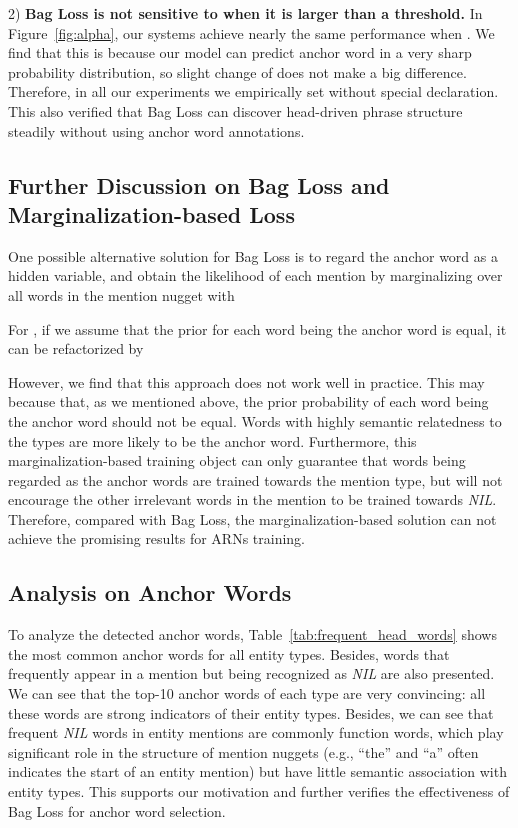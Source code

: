 \documentclass[11pt,a4paper]{article}
\begin{document}
2) \textbf{Bag Loss is not sensitive to  when it is larger than a threshold.} In Figure~\ref{fig:alpha}, our systems achieve nearly the same performance when  . We find that this is because our model can predict anchor word in a very sharp probability distribution, so slight change of  does not make a big difference. Therefore, in all our experiments we empirically set  without special declaration. This also verified that Bag Loss can discover head-driven phrase structure steadily without using anchor word annotations.

\subsection{Further Discussion on Bag Loss and Marginalization-based Loss}
One possible alternative solution for Bag Loss is to regard the anchor word as a hidden variable, and obtain the likelihood of each mention by marginalizing over all words in the mention nugget with

\begin{small}

\end{small}For , if we assume that the prior for each word being the anchor word is equal, it can be refactorized by

\begin{small}

\end{small}

However, we find that this approach does not work well in practice. This may because that, as we mentioned above, the prior probability of each word being the anchor word should not be equal. Words with highly semantic relatedness to the types are more likely to be the anchor word. Furthermore, this marginalization-based training object can only guarantee that words being regarded as the  anchor words are trained towards the mention type, but will not encourage the other irrelevant words in the mention to be trained towards \emph{NIL}. Therefore, compared with Bag Loss, the marginalization-based solution can not achieve the promising results for ARNs training.

\subsection{Analysis on Anchor Words}


To analyze the detected anchor words, Table~\ref{tab:frequent_head_words} shows the most common anchor words for all entity types. Besides, words that frequently appear in a mention but being recognized as \emph{NIL} are also presented. We can see that the top-10 anchor words of each type are very convincing: all these words are strong indicators of their entity types. Besides, we can see that frequent \emph{NIL} words in entity mentions are commonly function words, which play significant role in the structure of mention nuggets (e.g., ``the'' and ``a'' often indicates the start of an entity mention) but have little semantic association with entity types. This supports our motivation and further verifies the effectiveness of Bag Loss for anchor word selection.
\end{document}
